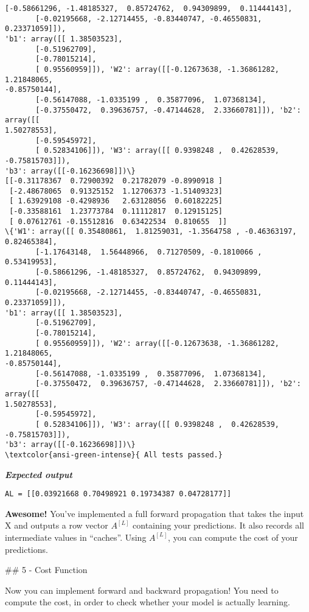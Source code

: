 \documentclass[11pt]{article}
\begin{document}
\begin{Verbatim}[commandchars=\\\{\}]
       [-0.58661296, -1.48185327,  0.85724762,  0.94309899,  0.11444143],
       [-0.02195668, -2.12714455, -0.83440747, -0.46550831,  0.23371059]]),
'b1': array([[ 1.38503523],
       [-0.51962709],
       [-0.78015214],
       [ 0.95560959]]), 'W2': array([[-0.12673638, -1.36861282,  1.21848065,
-0.85750144],
       [-0.56147088, -1.0335199 ,  0.35877096,  1.07368134],
       [-0.37550472,  0.39636757, -0.47144628,  2.33660781]]), 'b2': array([[
1.50278553],
       [-0.59545972],
       [ 0.52834106]]), 'W3': array([[ 0.9398248 ,  0.42628539, -0.75815703]]),
'b3': array([[-0.16236698]])\}
[[-0.31178367  0.72900392  0.21782079 -0.8990918 ]
 [-2.48678065  0.91325152  1.12706373 -1.51409323]
 [ 1.63929108 -0.4298936   2.63128056  0.60182225]
 [-0.33588161  1.23773784  0.11112817  0.12915125]
 [ 0.07612761 -0.15512816  0.63422534  0.810655  ]]
\{'W1': array([[ 0.35480861,  1.81259031, -1.3564758 , -0.46363197,  0.82465384],
       [-1.17643148,  1.56448966,  0.71270509, -0.1810066 ,  0.53419953],
       [-0.58661296, -1.48185327,  0.85724762,  0.94309899,  0.11444143],
       [-0.02195668, -2.12714455, -0.83440747, -0.46550831,  0.23371059]]),
'b1': array([[ 1.38503523],
       [-0.51962709],
       [-0.78015214],
       [ 0.95560959]]), 'W2': array([[-0.12673638, -1.36861282,  1.21848065,
-0.85750144],
       [-0.56147088, -1.0335199 ,  0.35877096,  1.07368134],
       [-0.37550472,  0.39636757, -0.47144628,  2.33660781]]), 'b2': array([[
1.50278553],
       [-0.59545972],
       [ 0.52834106]]), 'W3': array([[ 0.9398248 ,  0.42628539, -0.75815703]]),
'b3': array([[-0.16236698]])\}
\textcolor{ansi-green-intense}{ All tests passed.}
    \end{Verbatim}

    \textbf{\emph{Expected output}}

\begin{verbatim}
AL = [[0.03921668 0.70498921 0.19734387 0.04728177]]
\end{verbatim}

    \textbf{Awesome!} You've implemented a full forward propagation that
takes the input X and outputs a row vector \(A^{[L]}\) containing your
predictions. It also records all intermediate values in ``caches''.
Using \(A^{[L]}\), you can compute the cost of your predictions.

    \#\# 5 - Cost Function

Now you can implement forward and backward propagation! You need to
compute the cost, in order to check whether your model is actually
learning.
\end{document}
